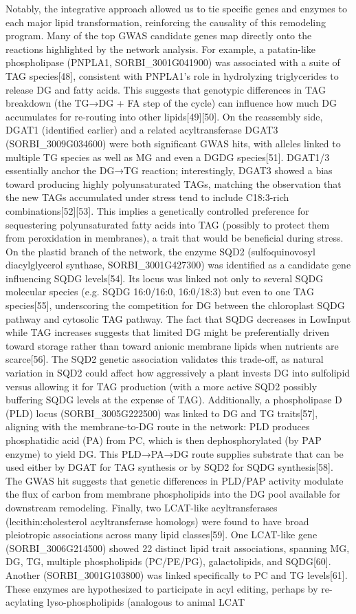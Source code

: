 \documentclass[10pt,letterpaper]{article}
\begin{document}
Notably, the integrative approach allowed us to tie specific genes and enzymes to each major lipid transformation, reinforcing the causality of this remodeling program. Many of the top GWAS candidate genes map directly onto the reactions highlighted by the network analysis. For example, a patatin-like phospholipase (PNPLA1, SORBI\_3001G041900) was associated with a suite of TAG species[48], consistent with PNPLA1’s role in hydrolyzing triglycerides to release DG and fatty acids. This suggests that genotypic differences in TAG breakdown (the TG→DG + FA step of the cycle) can influence how much DG accumulates for re-routing into other lipids[49][50]. On the reassembly side, DGAT1 (identified earlier) and a related acyltransferase DGAT3 (SORBI\_3009G034600) were both significant GWAS hits, with alleles linked to multiple TG species as well as MG and even a DGDG species[51]. DGAT1/3 essentially anchor the DG→TG reaction; interestingly, DGAT3 showed a bias toward producing highly polyunsaturated TAGs, matching the observation that the new TAGs accumulated under stress tend to include C18:3-rich combinations[52][53]. This implies a genetically controlled preference for sequestering polyunsaturated fatty acids into TAG (possibly to protect them from peroxidation in membranes), a trait that would be beneficial during stress. On the plastid branch of the network, the enzyme SQD2 (sulfoquinovosyl diacylglycerol synthase, SORBI\_3001G427300) was identified as a candidate gene influencing SQDG levels[54]. Its locus was linked not only to several SQDG molecular species (e.g. SQDG 16:0/16:0, 16:0/18:3) but even to one TAG species[55], underscoring the competition for DG between the chloroplast SQDG pathway and cytosolic TAG pathway. The fact that SQDG decreases in LowInput while TAG increases suggests that limited DG might be preferentially driven toward storage rather than toward anionic membrane lipids when nutrients are scarce[56]. The SQD2 genetic association validates this trade-off, as natural variation in SQD2 could affect how aggressively a plant invests DG into sulfolipid versus allowing it for TAG production (with a more active SQD2 possibly buffering SQDG levels at the expense of TAG). Additionally, a phospholipase D (PLD) locus (SORBI\_3005G222500) was linked to DG and TG traits[57], aligning with the membrane-to-DG route in the network: PLD produces phosphatidic acid (PA) from PC, which is then dephosphorylated (by PAP enzyme) to yield DG. This PLD→PA→DG route supplies substrate that can be used either by DGAT for TAG synthesis or by SQD2 for SQDG synthesis[58]. The GWAS hit suggests that genetic differences in PLD/PAP activity modulate the flux of carbon from membrane phospholipids into the DG pool available for downstream remodeling. Finally, two LCAT-like acyltransferases (lecithin:cholesterol acyltransferase homologs) were found to have broad pleiotropic associations across many lipid classes[59]. One LCAT-like gene (SORBI\_3006G214500) showed 22 distinct lipid trait associations, spanning MG, DG, TG, multiple phospholipids (PC/PE/PG), galactolipids, and SQDG[60]. Another (SORBI\_3001G103800) was linked specifically to PC and TG levels[61]. These enzymes are hypothesized to participate in acyl editing, perhaps by re-acylating lyso-phospholipids (analogous to animal LCAT 
\end{document}
